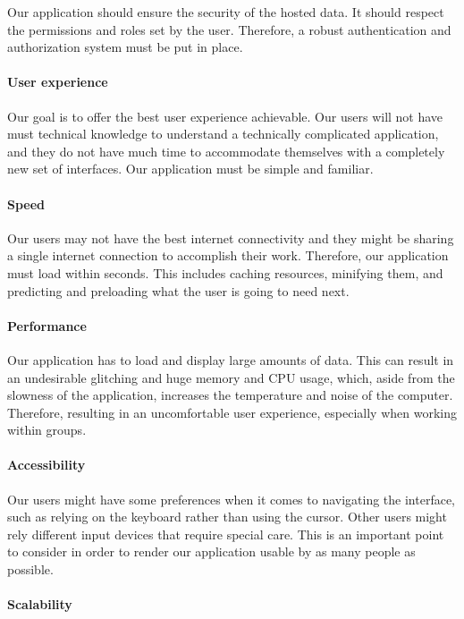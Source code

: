 Our application should ensure the security of the hosted data.
It should respect the permissions and roles set by the user.
Therefore, a robust authentication and authorization system must be put in place.

\paragraph{User experience}

Our goal is to offer the best user experience achievable.
Our users will not have must technical knowledge to understand a technically complicated application, and they do not have much time to accommodate themselves with a completely new set of interfaces.
Our application must be simple and familiar.

\paragraph{Speed}

Our users may not have the best internet connectivity and they might be sharing a single internet connection to accomplish their work.
Therefore, our application must load within seconds.
This includes caching resources, minifying them, and predicting and preloading what the user is going to need next.

\paragraph{Performance}

Our application has to load and display large amounts of data.
This can result in an undesirable glitching and huge memory and CPU usage, which, aside from the slowness of the application, increases the temperature and noise of the computer.
Therefore, resulting in an uncomfortable user experience, especially when working within groups.

\paragraph{Accessibility}

Our users might have some preferences when it comes to navigating the interface, such as relying on the keyboard rather than using the cursor.
Other users might rely different input devices that require special care.
This is an important point to consider in order to render our application usable by as many people as possible.

\paragraph{Scalability}

